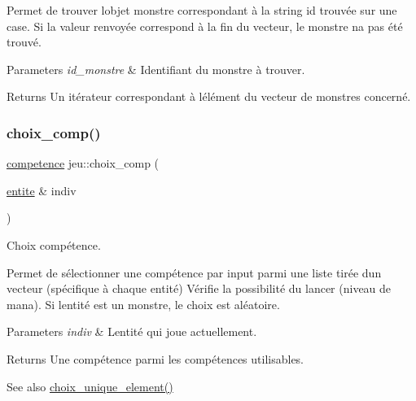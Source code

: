 Permet de trouver l\textquotesingle{}objet monstre correspondant à la string id trouvée sur une case. Si la valeur renvoyée correspond à la fin du vecteur, le monstre n\textquotesingle{}a pas été trouvé. 
\begin{DoxyParams}{Parameters}
{\em id\+\_\+monstre} & Identifiant du monstre à trouver. \\
\hline
\end{DoxyParams}
\begin{DoxyReturn}{Returns}
Un itérateur correspondant à l\textquotesingle{}élément du vecteur de monstres concerné. 
\end{DoxyReturn}
\mbox{\label{classjeu_a91981b755a6b0895703d9adf537f0ae6}} 
\subsubsection{\texorpdfstring{choix\+\_\+comp()}{choix\_comp()}}
{\footnotesize\ttfamily \hyperlink{classcompetence}{competence} jeu\+::choix\+\_\+comp (\begin{DoxyParamCaption}\item[{\hyperlink{classentite}{entite} \&}]{indiv }\end{DoxyParamCaption})}



Choix compétence. 

Permet de sélectionner une compétence par input parmi une liste tirée d\textquotesingle{}un vecteur (spécifique à chaque entité) Vérifie la possibilité du lancer (niveau de mana). Si l\textquotesingle{}entité est un monstre, le choix est aléatoire. 
\begin{DoxyParams}{Parameters}
{\em indiv} & L\textquotesingle{}entité qui joue actuellement. \\
\hline
\end{DoxyParams}
\begin{DoxyReturn}{Returns}
Une compétence parmi les compétences utilisables. 
\end{DoxyReturn}
\begin{DoxySeeAlso}{See also}
\hyperlink{namespaceio_ad045ca63d3481c2da3253a3944df18e4}{choix\+\_\+unique\+\_\+element()} 
\end{DoxySeeAlso}
\mbox{\label{classjeu_ad9ea0cb9e74e6d9b0385720528450f61}} 
